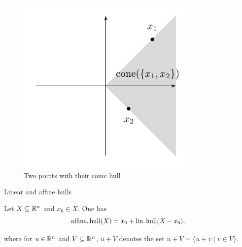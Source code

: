 \begin{frame}
  

\begin{figure}[htbp]
  \begin{center}{
   \includegraphics{../figures/picture3.pdf}

    }
    
  \end{center}
  \caption{Two points with their conic hull}\label{conv:fig:4}
\end{figure}

\end{frame}


\begin{frame}{Linear and affine hulls}


\begin{theorem}
  \label{conv:prop:1}
  Let $X\subseteq\mathbb{R}^n$ and $x_0\in X$. One has 
  \begin{displaymath}
    \operatorname{\mathrm{affine.hull}}(X) = x_0 + \operatorname{\mathrm{lin.hull}}(X - x_0),
  \end{displaymath}
 
\end{theorem}

\bigskip
 where for $u \in \mathbb{R}^n$ and $V\subseteq\mathbb{R}^n$,   $u +V$ denotes the set
  $u+V = \{ u+v \mid v \in V\}$.
  
\end{frame}


\begin{frame}
  
\end{frame}

\begin{frame}
  
\end{frame}

